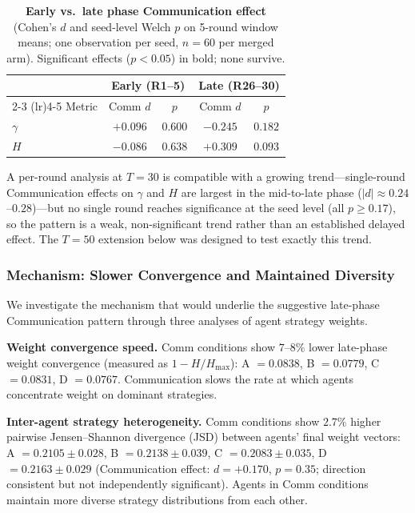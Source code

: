 \documentclass[11pt]{article}
\theoremstyle{definition}
\theoremstyle{remark}
\begin{document}
\begin{table}[H]
\centering
\caption{\textbf{Early vs.\ late phase Communication effect} (Cohen's $d$ and seed-level Welch $p$ on 5-round window means; one observation per seed, $n{=}60$ per merged arm). Significant effects ($p < 0.05$) in bold; none survive.}
\label{tab:joint_early_late}
\begin{tabular}{@{}lcccc@{}}
\toprule
 & \multicolumn{2}{c}{Early (R1--5)} & \multicolumn{2}{c}{Late (R26--30)} \\
\cmidrule(lr){2-3} \cmidrule(lr){4-5}
Metric & Comm $d$ & $p$ & Comm $d$ & $p$ \\
\midrule
$\gamma$ & $+0.096$ & $0.600$ & $-0.245$ & $0.182$ \\
$H$ & $-0.086$ & $0.638$ & $+0.309$ & $0.093$ \\
\bottomrule
\end{tabular}
\end{table}

A per-round analysis at $T{=}30$ is compatible with a growing trend---single-round Communication effects on $\gamma$ and $H$ are largest in the mid-to-late phase ($|d| \approx 0.24$--$0.28$)---but no single round reaches significance at the seed level (all $p \geq 0.17$), so the pattern is a weak, non-significant trend rather than an established delayed effect. The $T{=}50$ extension below was designed to test exactly this trend.

\subsubsection{Mechanism: Slower Convergence and Maintained Diversity}

We investigate the mechanism that would underlie the suggestive late-phase Communication pattern through three analyses of agent strategy weights.

\textbf{Weight convergence speed.} Comm conditions show $7$--$8\%$ lower late-phase weight convergence (measured as $1 - H/H_{\max}$): A $=0.0838$, B $=0.0779$, C $=0.0831$, D $=0.0767$. Communication slows the rate at which agents concentrate weight on dominant strategies.

\textbf{Inter-agent strategy heterogeneity.} Comm conditions show $2.7\%$ higher pairwise Jensen--Shannon divergence (JSD) between agents' final weight vectors: A $=0.2105 \pm 0.028$, B $=0.2138 \pm 0.039$, C $=0.2083 \pm 0.035$, D $=0.2163 \pm 0.029$ (Communication effect: $d{=}+0.170$, $p{=}0.35$; direction consistent but not independently significant). Agents in Comm conditions maintain more diverse strategy distributions from each other.
\end{document}
